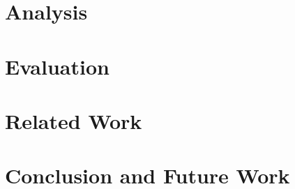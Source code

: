 \documentclass[manuscript,screen,review,anonymous]{acmart}
\begin{document}
\section{Analysis}
\label{sec:anl}


\section{Evaluation}
\label{sec:eval}


\section{Related Work}
\label{sec:rel}


\section{Conclusion and Future Work}
\label{sec:concl}




\end{document}
